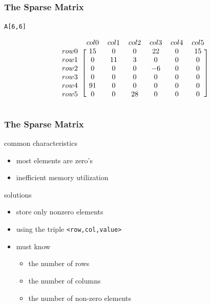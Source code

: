 \documentclass[newPxFont,sthlmFooter,nooffset]{beamer}
\begin{document}
\begin{frame}[t, fragile]
  \frametitle{The Sparse Matrix}
\texttt{A[6,6]}

\begin{equation*}
  \begin{blockarray}{r *{6}{c}}
      & col0 & col1 & col2 & col3 & col4 & col5 \\
\begin{block}{l [*{6}{c}]}
 row0 & 15  & 0   & 0  &  22 &   0 &   15   \\
 row1 & 0   & 11  & 3  &   0 &   0 &   0   \\
 row2 & 0   & 0   & 0  &  -6 &   0 &   0   \\
 row3 & 0   & 0   & 0  &   0 &   0 &   0   \\
 row4 & 91  & 0   & 0  &   0 &   0 &   0   \\
 row5 & 0   & 0   & 28 &   0 &   0 &   0   \\
\end{block}
  \end{blockarray}
\end{equation*}
\end{frame}

\begin{frame}[t, fragile]
  \frametitle{The Sparse Matrix}
common characteristics
\begin{itemize}
\item most elements are zero's 
\item inefficient memory utilization
\end{itemize}
\bigskip

solutions
\begin{itemize}
\item store only nonzero elements
\item using the triple \texttt{<row,col,value>}
\item must know
  \begin{itemize}
  \item the number of rows
  \item the number of columns
  \item the number of non-zero elements
  \end{itemize}

\end{itemize}

\end{frame}
\end{document}
